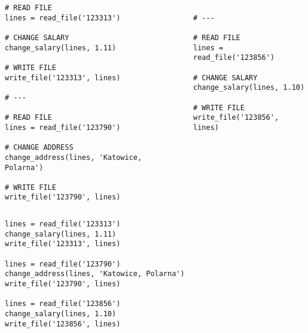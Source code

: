 \documentclass[aspectratio=169]{beamer}
\newcommand{\style}[1]{\ttfamily#1}
\begin{document}

\begin{frame}[fragile]
\begin{columns}
\begin{column}{0.5\textwidth}
\begin{lstlisting}[basicstyle=\style{\tiny}]
# READ FILE
lines = read_file('123313')

# CHANGE SALARY
change_salary(lines, 1.11)

# WRITE FILE
write_file('123313', lines)

# ---

# READ FILE
lines = read_file('123790')

# CHANGE ADDRESS
change_address(lines, 'Katowice, Polarna')

# WRITE FILE
write_file('123790', lines)
\end{lstlisting}
\end{column}
\begin{column}{0.5\textwidth}
\begin{lstlisting}[basicstyle=\style{\tiny}]

# ---

# READ FILE
lines = read_file('123856')

# CHANGE SALARY
change_salary(lines, 1.10)

# WRITE FILE
write_file('123856', lines)
\end{lstlisting}
\end{column}
\end{columns}
\end{frame}

\begin{frame}[fragile]
\begin{lstlisting}
lines = read_file('123313')
change_salary(lines, 1.11)
write_file('123313', lines)

lines = read_file('123790')
change_address(lines, 'Katowice, Polarna')
write_file('123790', lines)

lines = read_file('123856')
change_salary(lines, 1.10)
write_file('123856', lines)
\end{lstlisting}
\end{frame}
\end{document}
